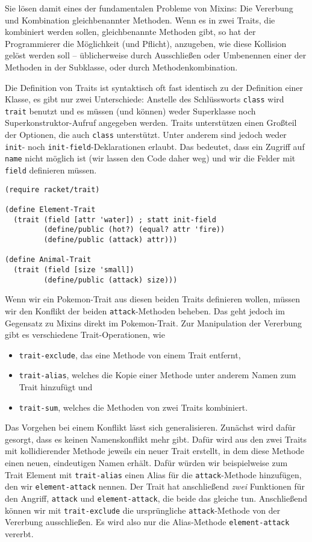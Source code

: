 Sie lösen damit eines der fundamentalen Probleme von Mixins: Die Vererbung und Kombination gleichbenannter Methoden. Wenn es in zwei Traits, die kombiniert werden sollen, gleichbenannte Methoden gibt, so hat der Programmierer die Möglichkeit (und Pflicht), anzugeben, wie diese Kollision gelöst werden soll -- üblicherweise durch Ausschließen oder Umbenennen einer der Methoden in der Subklasse, oder durch Methodenkombination.

Die Definition von Traits ist syntaktisch oft fast identisch zu der Definition einer Klasse, es gibt nur zwei Unterschiede: Anstelle des Schlüssworts \texttt{class} wird \texttt{trait} benutzt und es müssen (und können) weder Superklasse noch Superkonstruktor-Aufruf angegeben werden. Traits unterstützen einen Großteil der Optionen, die auch \texttt{class} unterstützt. Unter anderem sind jedoch weder \texttt{init}- noch \texttt{init-field}-Deklarationen erlaubt. Das bedeutet, dass ein Zugriff auf \texttt{name} nicht möglich ist (wir lassen den Code daher weg) und wir die Felder mit \texttt{field} definieren müssen.

\begin{lstlisting}
(require racket/trait)

(define Element-Trait
  (trait (field [attr 'water]) ; statt init-field
         (define/public (hot?) (equal? attr 'fire))
         (define/public (attack) attr)))

(define Animal-Trait
  (trait (field [size 'small])
         (define/public (attack) size)))
\end{lstlisting}

Wenn wir ein Pokemon-Trait aus diesen beiden Traits definieren wollen, müssen wir den Konflikt der beiden \texttt{attack}-Methoden beheben. Das geht jedoch im Gegensatz zu Mixins direkt im Pokemon-Trait. Zur Manipulation der Vererbung gibt es verschiedene Trait-Operationen, wie
\begin{itemize}
 \item \texttt{trait-exclude}, das eine Methode von einem Trait entfernt,
 \item \texttt{trait-alias}, welches die Kopie einer Methode unter anderem Namen zum Trait hinzufügt und
 \item \texttt{trait-sum}, welches die Methoden von zwei Traits kombiniert.
\end{itemize}

Das Vorgehen bei einem Konflikt lässt sich generalisieren. Zunächst wird dafür gesorgt, dass es keinen Namenskonflikt mehr gibt. Dafür wird aus den zwei Traits mit kollidierender Methode jeweils ein neuer Trait erstellt, in dem diese Methode einen neuen, eindeutigen Namen erhält. Dafür würden wir beispielweise zum Trait Element mit \texttt{trait-alias} einen Alias für die \texttt{attack}-Methode hinzufügen, den wir \texttt{element-attack} nennen. Der Trait hat anschließend \emph{zwei} Funktionen für den Angriff, \texttt{attack} und \texttt{element-attack}, die beide das gleiche tun. Anschließend können wir mit \texttt{trait-exclude} die ursprüngliche \texttt{attack}-Methode von der Vererbung ausschließen. Es wird also nur die Alias-Methode \texttt{element-attack} vererbt.

